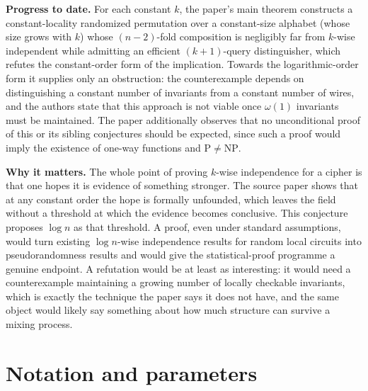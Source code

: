 \documentclass{aicr-conjecture}
\begin{document}
\textbf{Progress to date.} For each constant $k$, the paper's main
theorem constructs a constant-locality randomized permutation over a
constant-size alphabet (whose size grows with $k$) whose $(n-2)$-fold
composition is negligibly far from $k$-wise independent while admitting
an efficient $(k+1)$-query distinguisher, which refutes the
constant-order form of the implication. Towards the logarithmic-order
form it supplies only an obstruction: the counterexample depends on
distinguishing a constant number of invariants from a constant number of
wires, and the authors state that this approach is not viable once
$\omega(1)$ invariants must be maintained. The paper additionally
observes that no unconditional proof of this or its sibling conjectures
should be expected, since such a proof would imply the existence of
one-way functions and $\mathrm{P} \neq \mathrm{NP}$.

\textbf{Why it matters.} The whole point of proving $k$-wise
independence for a cipher is that one hopes it is evidence of something
stronger. The source paper shows that at any constant order the hope is
formally unfounded, which leaves the field without a threshold at which
the evidence becomes conclusive. This conjecture proposes $\log n$ as
that threshold. A proof, even under standard assumptions, would turn
existing $\log n$-wise independence results for random local circuits
into pseudorandomness results and would give the statistical-proof
programme a genuine endpoint. A refutation would be at least as
interesting: it would need a counterexample maintaining a growing number
of locally checkable invariants, which is exactly the technique the
paper says it does not have, and the same object would likely say
something about how much structure can survive a mixing process.

\section{Notation and parameters}\label{sec:notation}
\end{document}
